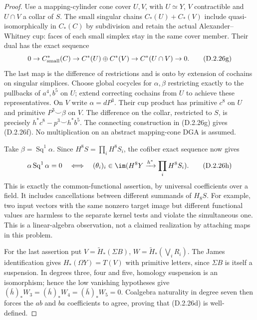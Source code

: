 \begin{proof}
Use a mapping-cylinder cone cover $U,V$, with $U\simeq Y$,
$V$ contractible and $U\cap V$ a collar of $S$.
The small singular chains $C_*(U)+C_*(V)$ include
quasi-isomorphically in $C_*(C)$ by subdivision and retain the
actual Alexander--Whitney cup: faces of each small simplex stay
in the same cover member. Their dual has the exact sequence
\[
 0\to C^*_{\rm small}(C)\to C^*(U)\oplus C^*(V)
       \to C^*(U\cap V)\to0.
 \tag{D.2.26g}
\]
The last map is the difference of restrictions and is onto by
extension of cochains on singular simplices.
Choose global cocycles for $\alpha,\beta$ restricting exactly
to the pullbacks of $a^4,b^5$ on $U$; extend correcting cochains
from $U$ to achieve these representatives. On $V$ write
$\alpha=dP^3$. Their cup product has primitive $c^8$ on $U$
and primitive $P^3\smile\beta$ on $V$. The difference on the
collar, restricted to $S$, is precisely
$h^*c^8-p^3\smile h^*b^5$. The connecting construction in
\textup{(D.2.26g)} gives \textup{(D.2.26f)}.
No multiplication on an abstract mapping-cone DGA is assumed.

Take $\beta=\operatorname{Sq}^1\alpha$. Since
$H^8S=\prod_iH^8S_i$, the cofiber exact sequence now gives
\[
 \alpha\operatorname{Sq}^1\alpha=0
 \quad\Longleftrightarrow\quad
 (\theta_i)_i\in\im(H^8Y\xrightarrow{h^*}\prod_iH^8S_i).
 \tag{D.2.26h}
\]
This is exactly the common-functional assertion, by universal
coefficients over a field. It includes cancellations between
different summands of $H_8S$. For example, two input vectors
with the same nonzero target image but different functional
values are harmless to the separate kernel tests and violate
the simultaneous one. This is a linear-algebra observation,
not a claimed realization by attaching maps in this problem.

For the last assertion put $V=\widetilde H_*(\Sigma B)$,
$W=\widetilde H_*(\bigvee_iR_i)$. The James identification
gives $H_*(\Omega Y)=T(V)$ with primitive letters, since
$\Sigma B$ is itself a suspension. In degrees three, four and
five, homology suspension is an isomorphism; hence the low
vanishing hypotheses give $(\bar h)_*W_3=(\bar h)_*W_4
=(\bar h)_*W_5=0$. Coalgebra naturality in degree seven
then forces the $ab$ and $ba$ coefficients to agree, proving
that \textup{(D.2.26d)} is well-defined.


\end{proof}
